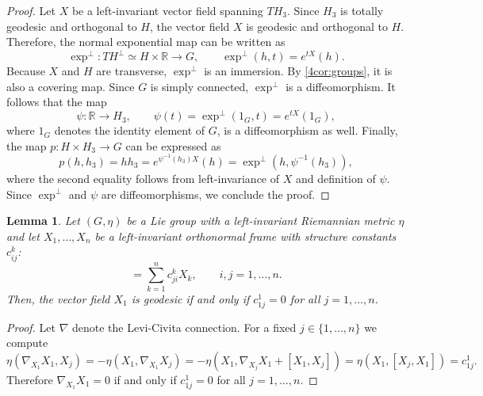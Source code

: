 \documentclass[reqno]{amsart}
\newtheorem{lemma}[theorem]{Lemma}
\theoremstyle{remark}
\theoremstyle{plain}
\begin{document}
\begin{proof}
	Let \(X\) be a left-invariant vector field spanning \(TH_3\). Since \(H_3\) is totally geodesic and orthogonal to \(H\), the vector field \(X\) is geodesic and orthogonal to \(H\). Therefore, the normal exponential map can be written as
	\[
	\exp^\perp: TH^{\perp} \simeq H \times \mathbb{R} \to G, \qquad \exp^\perp(h,t) = e^{tX}(h).
	\]
	Because \(X\) and \(H\) are transverse, \(\exp^\perp\) is an immersion. By \cref{4cor:groups}, it is also a covering map. Since \(G\) is simply connected, \(\exp^\perp\) is a diffeomorphism. It follows that the map
	\[
	\psi: \mathbb{R} \to H_3, \qquad \psi(t) =\exp^\perp(1_G,t)=e^{tX}(1_G),
	\]
	where $1_G$ denotes the identity element of $G$, is a diffeomorphism as well. Finally, the map \(p: H \times H_3 \to G\) can be expressed as 
	\[
	p(h,h_3)=hh_3=e^{\psi^{-1}(h_3)X}(h)=\exp^{\perp}(h,\psi^{-1}(h_3)),
	\]
	where the second equality follows from left-invariance of $X$ and definition of $\psi$. Since $\exp^{\perp}$ and $\psi$ are diffeomorphisms, we conclude the proof.
\end{proof}

\begin{lemma}\label{lem:geodesics}
    Let $(G,\eta)$ be a Lie group with a left-invariant Riemannian metric $\eta$ and let $X_1,\dots,X_n$ be a left-invariant orthonormal frame with structure constants  $c_{ij}^k$: 
    \begin{equation}
        [X_i,X_j]=\sum_{k=1}^nc_{ji}^kX_k,\qquad i,j=1,\dots,n.
    \end{equation}
    Then, the vector field $X_1$ is geodesic if and only if $c_{1j}^1=0$ for all $j=1,\dots,n$.
\end{lemma}
\begin{proof}
    Let $\nabla$ denote the Levi-Civita connection. For a fixed $j\in\{1,\dots,n\}$ we compute 
    \begin{equation}
        \eta(\nabla_{X_1}X_1,X_j)=-\eta(X_1,\nabla_{X_1}X_j)=-\eta(X_1,\nabla_{X_j}X_1+[X_1,X_j])=\eta(X_1,[X_j,X_1])=c_{1j}^1.
    \end{equation}
    Therefore $\nabla_{X_1}X_1=0$ if and only if $c_{1j}^1=0$ for all $j=1,\dots,n$.
\end{proof}
\end{document}
